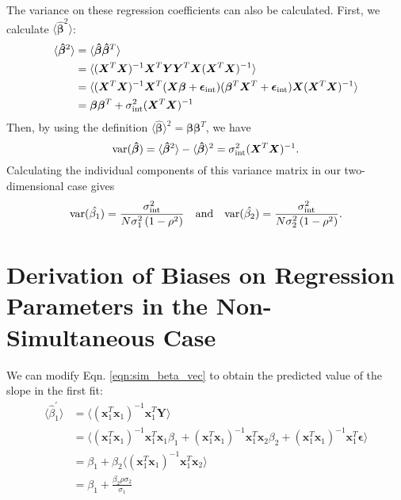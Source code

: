 The variance on these regression coefficients can also be calculated. First, we calculate $\langle\bm{\hat{\beta}}^2\rangle$:
\begin{align*}
    \langle\bm{\hat{\beta}}^2\rangle &= \langle\bm{\hat{\beta}}\bm{\hat{\beta}}^T\rangle \\
    &= \langle(\bm{X}^T\bm{X})^{-1}\bm{X}^T\bm{YY}^T\bm{X}(\bm{X}^T\bm{X})^{-1}\rangle \\
    &= \langle(\bm{X}^T\bm{X})^{-1}\bm{X}^T(\bm{X\beta}+\bm{\epsilon}_\text{int})(\bm{\beta}^T\bm{X}^T+\bm{\epsilon}_\text{int})\bm{X}(\bm{X}^T\bm{X})^{-1}\rangle\\
    &= \bm{\beta\beta}^T + \sigma_{\text{int}}^2(\bm{X}^T\bm{X})^{-1}
\end{align*}
Then, by using the definition $\langle\bm{\hat{\beta}}\rangle^2 = \bm{\beta\beta}^T$, we have$$\text{var}(\bm{\hat{\beta}})= \langle\bm{\hat{\beta}}^2\rangle-\langle\bm{\hat{\beta}}\rangle^2 = \sigma_{\text{int}}^2(\bm{X}^T\bm{X})^{-1}.$$
Calculating the individual components of this variance matrix in our two-dimensional case gives
\begin{equation}
    \text{var}(\hat{\beta_1})=\frac{\sigma_{\text{int}}^2}{N\sigma_1^2\left(1-\rho^2\right)}\quad\text{and}\quad\text{var}(\hat{\beta_2})=\frac{\sigma_{\text{int}}^2}{N\sigma_2^2\left(1-\rho^2\right)}.
    \label{eqn:var_betahat_simultaneous}
\end{equation}


\section{Derivation of Biases on Regression Parameters in the Non-Simultaneous Case}
\label{app:non_simultaneous_ols}
We can modify Eqn. \ref{eqn:sim_beta_vec} to obtain the predicted value of the slope in the first fit:
\begin{align*}
    \langle\hat{\beta}_1^\prime\rangle &= \langle(\bm{x}_1^T\bm{x}_1)^{-1}\bm{x}_1^T\bm{Y}\rangle\\
    &= \langle(\bm{x}_1^T\bm{x}_1)^{-1}\bm{x}_1^T\bm{x}_1\beta_1 + (\bm{x}_1^T\bm{x}_1)^{-1}\bm{x}_1^T\bm{x}_2\beta_2 + (\bm{x}_1^T\bm{x}_1)^{-1}\bm{x}_1^T\bm{\epsilon}\rangle\\
    &= \beta_1 + \beta_2\langle(\bm{x}_1^T\bm{x}_1)^{-1}\bm{x}_1^T\bm{x}_2\rangle\\
    &= \beta_1 + \frac{\beta_2\rho\sigma_2}{\sigma_1}
\end{align*}

